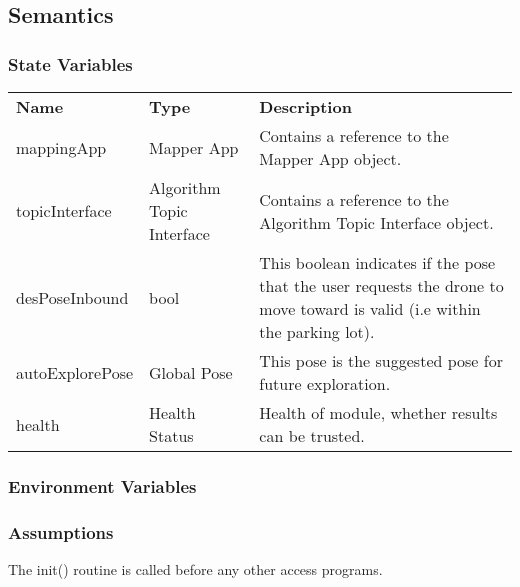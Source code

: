 \documentclass[12pt, titlepage]{article}
\begin{document}
\subsection{Semantics}
\subsubsection{State Variables}
\begin{center}
\begin{tabular}{p{3 cm} p{3cm} p{7cm} }
\hline
\textbf{Name} & \textbf{Type} & \textbf{Description}  \\
mappingApp & Mapper App & Contains a reference to the Mapper App object. \\
topicInterface & Algorithm Topic Interface & Contains a reference to the Algorithm Topic Interface object.\\
desPoseInbound & bool & This boolean indicates if the pose that the user requests the drone to move toward is valid (i.e within the parking lot).  \\ 
autoExplorePose & Global Pose & This pose is the suggested pose for future exploration.  \\ 
health & Health Status & Health of module, whether results can be trusted.   \\
\hline
\hline
\end{tabular}
\end{center}
\subsubsection{Environment Variables}
\subsubsection{Assumptions}
The init() routine is called before any other access programs.
\end{document}
